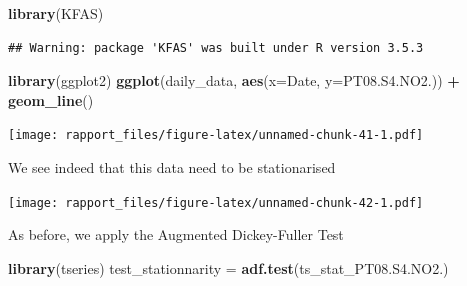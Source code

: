\documentclass[]{article}
\newenvironment{Shaded}{\begin{snugshade}}{\end{snugshade}}
\newcommand{\KeywordTok}[1]{\textcolor[rgb]{0.13,0.29,0.53}{\textbf{#1}}}
\newcommand{\DataTypeTok}[1]{\textcolor[rgb]{0.13,0.29,0.53}{#1}}
\newcommand{\DecValTok}[1]{\textcolor[rgb]{0.00,0.00,0.81}{#1}}
\newcommand{\StringTok}[1]{\textcolor[rgb]{0.31,0.60,0.02}{#1}}
\newcommand{\CommentTok}[1]{\textcolor[rgb]{0.56,0.35,0.01}{\textit{#1}}}
\newcommand{\OperatorTok}[1]{\textcolor[rgb]{0.81,0.36,0.00}{\textbf{#1}}}
\newcommand{\NormalTok}[1]{#1}
\begin{document}
\begin{Shaded}
\begin{Highlighting}[]
\KeywordTok{library}\NormalTok{(KFAS)}
\end{Highlighting}
\end{Shaded}

\begin{verbatim}
## Warning: package 'KFAS' was built under R version 3.5.3
\end{verbatim}

\begin{Shaded}
\begin{Highlighting}[]
\KeywordTok{library}\NormalTok{(ggplot2)}
\KeywordTok{ggplot}\NormalTok{(daily_data,  }\KeywordTok{aes}\NormalTok{(}\DataTypeTok{x=}\NormalTok{Date, }\DataTypeTok{y=}\NormalTok{PT08.S4.NO2.)) }\OperatorTok{+}\StringTok{ }\KeywordTok{geom_line}\NormalTok{()}
\end{Highlighting}
\end{Shaded}

\texttt{[image: rapport\_files/figure-latex/unnamed-chunk-41-1.pdf]}

We see indeed that this data need to be stationarised

\begin{Shaded}
\end{Shaded}

\texttt{[image: rapport\_files/figure-latex/unnamed-chunk-42-1.pdf]}

As before, we apply the Augmented Dickey-Fuller Test

\begin{Shaded}
\begin{Highlighting}[]
\KeywordTok{library}\NormalTok{(tseries)}
\NormalTok{test_stationnarity =}\StringTok{ }\KeywordTok{adf.test}\NormalTok{(ts_stat_PT08.S4.NO2.)}
\end{Highlighting}
\end{Shaded}
\end{document}

